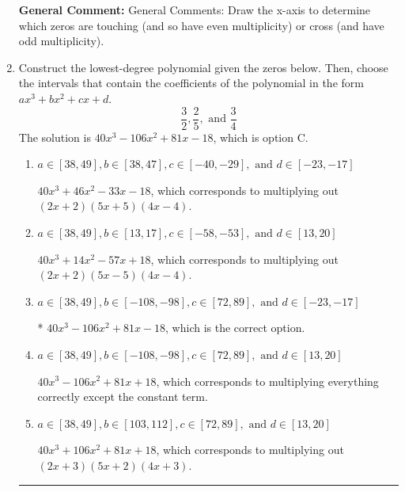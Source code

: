 \documentclass{extbook}[14pt]
\newcommand{\litem}[1]{\item #1

\rule{\textwidth}{0.4pt}}
\begin{document}
\begin{enumerate}
{\textbf{General Comment:} General Comments: Draw the x-axis to determine which zeros are touching (and so have even multiplicity) or cross (and have odd multiplicity).
}
\litem{
Construct the lowest-degree polynomial given the zeros below. Then, choose the intervals that contain the coefficients of the polynomial in the form $ax^3+bx^2+cx+d$.
\[ \frac{3}{2}, \frac{2}{5}, \text{ and } \frac{3}{4} \]
The solution is \( 40x^{3} -106 x^{2} +81 x -18 \), which is option C.\begin{enumerate}[label=\Alph*.]
\item \( a \in [38, 49], b \in [38, 47], c \in [-40, -29], \text{ and } d \in [-23, -17] \)

$40x^{3} +46 x^{2} -33 x -18$, which corresponds to multiplying out $(2x + 2)(5x + 5)(4x -4)$.
\item \( a \in [38, 49], b \in [13, 17], c \in [-58, -53], \text{ and } d \in [13, 20] \)

$40x^{3} +14 x^{2} -57 x + 18$, which corresponds to multiplying out $(2x + 2)(5x -5)(4x -4)$.
\item \( a \in [38, 49], b \in [-108, -98], c \in [72, 89], \text{ and } d \in [-23, -17] \)

* $40x^{3} -106 x^{2} +81 x -18$, which is the correct option.
\item \( a \in [38, 49], b \in [-108, -98], c \in [72, 89], \text{ and } d \in [13, 20] \)

$40x^{3} -106 x^{2} +81 x + 18$, which corresponds to multiplying everything correctly except the constant term.
\item \( a \in [38, 49], b \in [103, 112], c \in [72, 89], \text{ and } d \in [13, 20] \)

$40x^{3} +106 x^{2} +81 x + 18$, which corresponds to multiplying out $(2x + 3)(5x + 2)(4x + 3)$.
\end{enumerate}

}
\end{enumerate}
\end{document}
